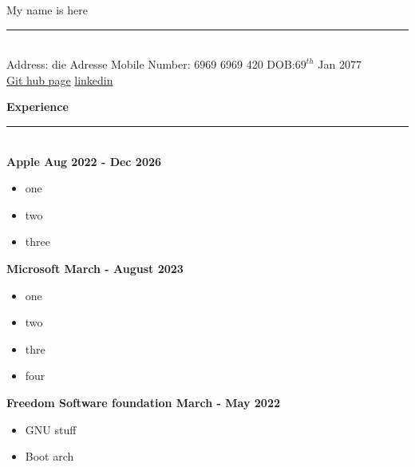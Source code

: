 \documentclass[a4 paper, 14pt]{article}
\begin{document}
\thispagestyle{empty}

\noindent
\huge{My name is here}
\vspace{-0.7cm}\\
\rule{18cm}{2pt}

\normalsize

\hfill \\
Address: \hfill die Adresse  
\newline
 {Mobile Number:} \hfill 6969 6969 420
\newline
DOB:\hfill $69^{th}$ Jan 2077 \\
\href{https://www.imdb.com/title/tt6091904/}{Git hub page} 
\hfill
\href{https://www.google.com/search?client=firefox-b-d&q=filthy+frank#vhid=QmaoIWY0HdiQqM&vssid=l}{linkedin}

\vspace{0.3cm}

\noindent \LARGE \textbf{Experience} \vspace{-0.3cm}\\ %
\rule{18cm}{2pt} \\ %
\large \bf{Apple} \hfill Aug 2022 - Dec 2026
\vspace{-0.3cm}


\normalsize  \normalfont
\begin{itemize}
	\item one
	\item two
	\item three
\end{itemize}

\noindent
\large \bf{Microsoft} \hfill March - August
2023 
\vspace{-0.3cm}

\normalfont \normalsize
\begin{itemize}
\setlength\itemsep{0em} %
	\item one
	\item two 
	\item thre
	\item four
\end{itemize}

\noindent
\large \bf{Freedom Software foundation} \hfill March - May 2022
\vspace{-0.3cm}

\begin{itemize}
	\setlength\itemsep{0em} %
	\normalsize \normalfont
	\item GNU stuff
	\item Boot arch
\end{itemize}
\end{document}
